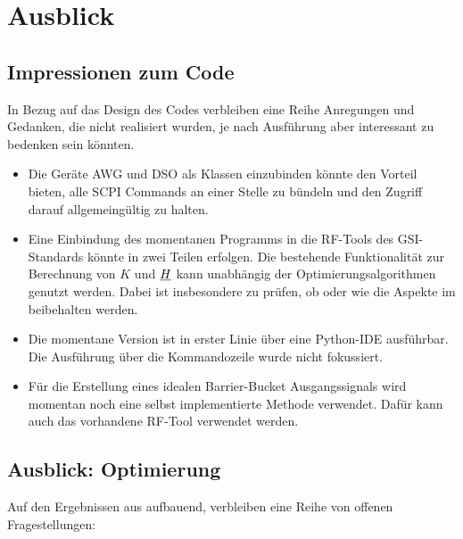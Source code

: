 \documentclass[../Report.tex]{subfiles}
\begin{document}
\chapter{Ausblick}
\label{chap:ausb}

\section{Impressionen zum Code}
\label{sec:ausb.code}
In Bezug auf das Design des Codes verbleiben eine Reihe Anregungen und Gedanken, die nicht realisiert wurden, je nach Ausführung aber interessant zu bedenken sein könnten.

\begin{itemize}
	\item	Die Geräte AWG und DSO als Klassen einzubinden könnte den Vorteil bieten, alle SCPI Commands an einer Stelle zu bündeln und den Zugriff darauf allgemeingültig zu halten.
	
	\item	Eine Einbindung des momentanen Programms in die RF-Tools des GSI-Standards könnte in zwei Teilen erfolgen. Die bestehende Funktionalität zur Berechnung von $K$ und $\underline{H}$ kann unabhängig der Optimierungsalgorithmen genutzt werden. Dabei ist insbesondere zu prüfen, ob oder wie die Aspekte im  beibehalten werden. 
	
	\item 	Die momentane Version ist in erster Linie über eine Python-IDE ausführbar. Die Ausführung über die Kommandozeile wurde nicht fokussiert.
	\item Für die Erstellung eines idealen Barrier-Bucket Ausgangssignals wird momentan noch eine selbst implementierte Methode verwendet. Dafür kann auch das vorhandene RF-Tool verwendet werden.
	
\end{itemize}





\section{Ausblick: Optimierung}
\label{sec:ausb.opti}

Auf den Ergebnissen aus  aufbauend, verbleiben eine Reihe von offenen Fragestellungen:
\end{document}
